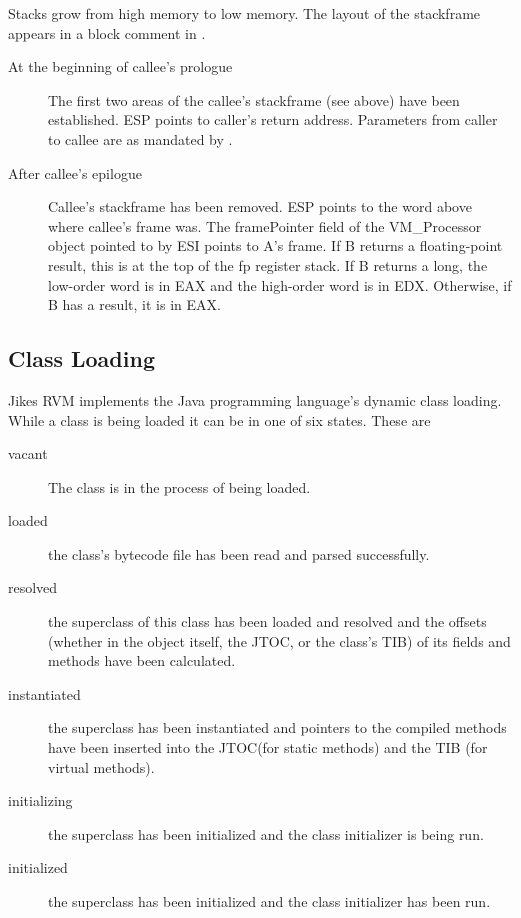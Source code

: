 
Stacks grow from high memory to low memory.
The layout of the stackframe appears in a block comment in
{\LintelStackframeLayoutURL}.


\begin{description}
\item[At the beginning of callee's prologue]
The first two areas of the callee's stackframe (see above) have been
     established.  ESP points to caller's return address.
     Parameters from caller to callee are as mandated by 
{\LintelRegisterConstantsURL}.
\item[After callee's epilogue]
     Callee's stackframe has been removed.  ESP points to the word above where
     callee's frame was.  The framePointer field
     of the VM\_Processor object pointed to by ESI points to A's
     frame.  If B returns a floating-point result, this is at
     the top of the fp register stack.  If B returns a long, the
     low-order word is in EAX and the high-order word is in EDX.
     Otherwise, if B has a result, it is in EAX.

\end{description}

\JavaTMFooter

\AIXPPCTMFooter

\subsection{Class Loading} \label{sssec:classLoading}

Jikes\TMweb{} RVM implements the Java\TMweb{} programming
language's dynamic class loading. While a class is being loaded it can
be in one of six states. These are
\begin{description}
\item[vacant] The class is in the process of being loaded.
\item[loaded] the class's bytecode file has been read and parsed successfully.
\item[resolved] the superclass of this class has been loaded and resolved and
the offsets (whether in the object itself, the JTOC, or the class's
TIB) of its fields and methods have been calculated.
\item[instantiated] the superclass has been instantiated and pointers to the
compiled methods have been inserted into the JTOC(for static methods) and the
TIB (for virtual methods).
\item[initializing] the superclass has been initialized and the class
initializer is being run.
\item[initialized] the superclass has been initialized and the class
initializer has been run.
\end{description}

